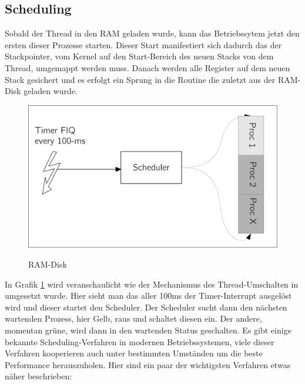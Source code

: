 \subsection{Scheduling}
Sobald der Thread in den RAM geladen wurde, kann das Betriebssytem jetzt den ersten dieser Prozesse starten. Dieser Start manifestiert sich dadurch das der Stackpointer, vom Kernel auf den Start-Bereich des neuen Stacks von dem Thread, umgemappt werden muss. Danach werden alle Register auf dem neuen Stack gesichert und es erfolgt ein Sprung in die Routine die zuletzt aus der RAM-Disk geladen wurde. 
\begin{figure}[H]
	\begin{center}	
	\caption{RAM-Disk}
	\includegraphics[scale=0.60]{common/scheduler.pdf}
	\label{scheduler}
	\end{center}
\end{figure}
\noindent
In Grafik \ref{scheduler} wird veranschaulicht wie der Mechanismus des Thread-Umschalten in \mops umgesetzt wurde. Hier sieht man das aller 100ms der Timer-Interrupt ausgel\"ost wird und dieser startet den Scheduler. Der Scheduler sucht dann den n\"achsten wartenden Prozess, hier Gelb, raus und schaltet diesen ein. Der andere, momentan gr\"une, wird dann in den wartenden Status geschalten.
Es gibt einige bekannte Scheduling-Verfahren in modernen Betriebssystemen, viele dieser Verfahren kooperieren auch unter bestimmten Umst\"anden um die beste Performance herauszuholen. Hier sind ein paar der wichtigsten Verfahren etwas n\"aher beschrieben:
